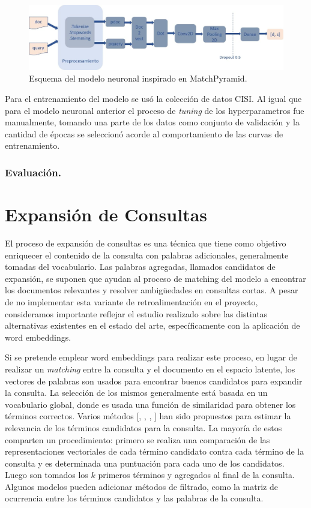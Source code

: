 \documentclass{llncs}
\begin{document}
\begin{figure}
	\begin{center}
		\includegraphics[width=\linewidth]{ ./images/match.jpg}
		\caption{Esquema del modelo neuronal inspirado en MatchPyramid.}
		\label{matchpyramid}
	\end{center}
\end{figure}

Para el entrenamiento del modelo se usó la colección de datos CISI. Al igual que para el modelo neuronal anterior el proceso de \textit{tuning} de los hyperparametros fue manualmente, tomando una parte de los datos como conjunto de validación y la cantidad de épocas se seleccionó acorde al comportamiento de las curvas de entrenamiento.

\subsubsection{Evaluación.}

\section{Expansión de Consultas}
El proceso de expansión de consultas es una técnica que tiene como objetivo enriquecer el contenido de la consulta con palabras adicionales, generalmente tomadas del vocabulario. Las palabras agregadas, llamados candidatos de expansión, se suponen que ayudan al proceso de matching del modelo a encontrar los documentos relevantes y resolver ambig\"uedades en consultas cortas. A pesar de no implementar esta variante de retroalimentación en el proyecto, consideramos importante reflejar el estudio realizado sobre las distintas alternativas existentes en el estado del arte, específicamente con la aplicación de word embeddings.  

Si se pretende emplear word embeddings para realizar este proceso, en lugar de realizar un \textit{matching} entre la consulta y el documento en el espacio latente, los vectores de palabras son usados para encontrar buenos candidatos para expandir la consulta. La selección de los mismos generalmente está basada en un vocabulario global, donde es usada una función de similaridad para obtener los términos correctos. Varios métodos [\cite{160}, \cite{190}, \cite{191}, \cite{165}] han sido propuestos para estimar la relevancia de los términos candidatos para la consulta. La mayoría de estos comparten un procedimiento: primero se realiza una comparación de las representaciones vectoriales de cada término candidato contra cada término de la consulta y es determinada una puntuación para cada uno de los candidatos. Luego son tomados los $k$ primeros términos y agregados al final de la consulta. Algunos modelos \cite{192} pueden adicionar métodos de filtrado, como la matriz de ocurrencia entre los términos candidatos y las palabras de la consulta. 
\end{document}
